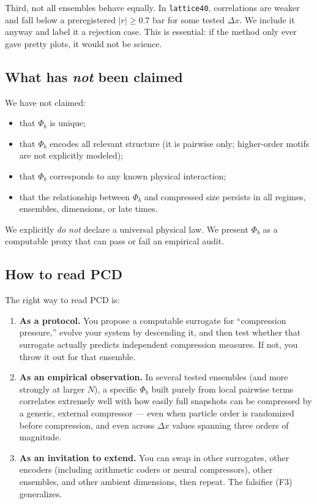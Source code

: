 \documentclass[11pt,a4paper]{article}
\numberwithin{equation}{section}
\newcommand{\phib}{\Phi_b}
\begin{document}
Third, not all ensembles behave equally. In \texttt{lattice40}, correlations are weaker and fall below a preregistered $|r|\ge 0.7$ bar for some tested $\Delta x$. We include it anyway and label it a rejection case. This is essential: if the method only ever gave pretty plots, it would not be science.

\subsection{What has \emph{not} been claimed}
We have not claimed:
\begin{itemize}
\item that $\phib$ is unique;
\item that $\phib$ encodes all relevant structure (it is pairwise only; higher-order motifs are not explicitly modeled);
\item that $\phib$ corresponds to any known physical interaction;
\item that the relationship between $\phib$ and compressed size persists in all regimes, ensembles, dimensions, or late times.
\end{itemize}

We explicitly \emph{do not} declare a universal physical law. We present $\phib$ as a computable proxy that can pass or fail an empirical audit.

\subsection{How to read PCD}
The right way to read PCD is:
\begin{enumerate}[label=(\alph*)]
\item \textbf{As a protocol.}  
You propose a computable surrogate for ``compression pressure,'' evolve your system by descending it, and then test whether that surrogate actually predicts independent compression measures. If not, you throw it out for that ensemble.

\item \textbf{As an empirical observation.}  
In several tested ensembles (and more strongly at larger $N$), a specific $\phib$ built purely from local pairwise terms correlates extremely well with how easily full snapshots can be compressed by a generic, external compressor --- even when particle order is randomized before compression, and even across $\Delta x$ values spanning three orders of magnitude.

\item \textbf{As an invitation to extend.}  
You can swap in other surrogates, other encoders (including arithmetic coders or neural compressors), other ensembles, and other ambient dimensions, then repeat. The falsifier (F3) generalizes.
\end{enumerate}
\end{document}
